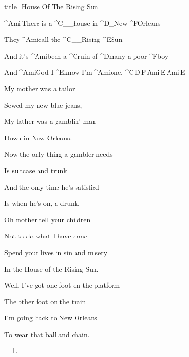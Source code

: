 \begin{song}{title=\predtitle\centering House Of The Rising Sun \\\large \vspace*{-0.3cm}}  %
\begin{centerjustified}
\nejvetsi

\sloka 
	^{Ami\,}There is a ^{C{\color{white}\_\_}}house in ^{D{\color{white}\_}}New ^{F}Orleans
	
	They ^{Ami}call the ^{C{\color{white}\_\_}}Rising ^{E}Sun

	And it's ^{Ami}been a ^{C}ruin of ^{D}many a poor ^{F}boy

	And ^{Ami}God I ^{E}know I'm ^{Ami}one. ^{C\,D\,F\,Ami\,E\,Ami\,E}

\sloka
	My mother was a tailor
	
	Sewed my new blue jeans,
	
	My father was a gamblin' man
   	
   	Down in New Orleans.

\sloka
	Now the only thing a gambler needs
   	
   	Is suitcase and trunk
   	
   	And the only time he's satisfied
   	
   	Is when he's on, a drunk.

\sloka
	Oh mother tell your children
   	
   	Not to do what I have done
   	
   	Spend your lives in sin and misery
	
	In the House of the Rising Sun.

\sloka
	Well, I've got one foot on the platform
   	
   	The other foot on the train
   	
   	I'm going back to New Orleans
   	
   	To wear that ball and chain.

\sloka = 1.


\end{centerjustified}
\setcounter{Slokočet}{0}
\end{song}

